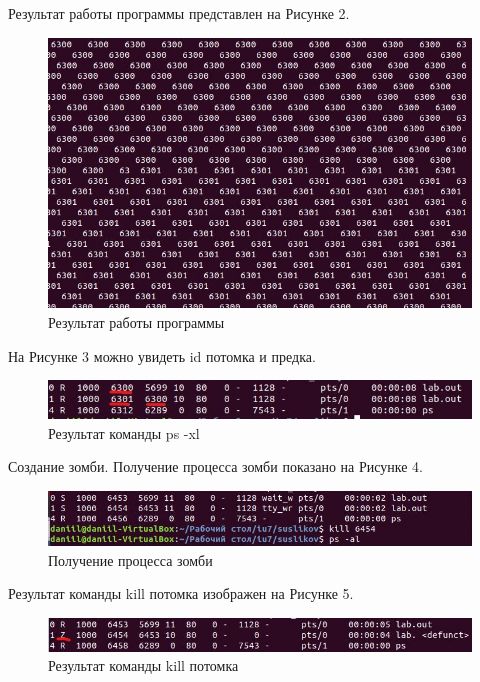 \documentclass[14pt, a4paper]{extarticle}
\begin{document}
	Результат работы программы представлен на Рисунке 2.
	\begin{figure}[h]
		\centering
		\includegraphics[scale=1]{source/2}
		\caption{Результат работы программы}
	\end{figure}
	
	На Рисунке 3 можно увидеть id потомка и предка.
	\begin{figure}[h]
		\centering
		\includegraphics[scale=1]{source/3v2}
		\caption{Результат команды ps -xl}
	\end{figure}
	
	\newpage
	Создание зомби. \newline
	Получение процесса зомби показано на Рисунке 4.
	\begin{figure}[h]
		\centering
		\includegraphics[scale=1]{source/41}
		\caption{Получение процесса зомби}
	\end{figure}

	Результат команды kill потомка изображен на Рисунке 5.
	\begin{figure}[h]
		\centering
		\includegraphics[scale=1]{source/4v2}
		\caption{Результат команды kill потомка}
	\end{figure}
	
\end{document}
